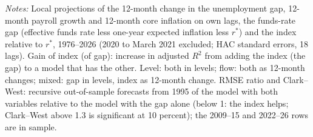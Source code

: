 \begin{table}[tbp]\centering\small
\caption{Does the Index Add to the Funds-Rate Gap?}\label{tab:stance}
\begin{flushleft}\footnotesize\textit{Notes:} Local projections of the 12-month change in the unemployment gap, 12-month payroll growth and 12-month core inflation on own lags, the funds-rate gap (effective funds rate less one-year expected inflation less $r^*$) and the index relative to $r^*$, 1976--2026 (2020 to March 2021 excluded; HAC standard errors, 18 lags). Gain of index (of gap): increase in adjusted $R^2$ from adding the index (the gap) to a model that has the other. Level: both in levels; flow: both as 12-month changes; mixed: gap in levels, index as 12-month change. RMSE ratio and Clark--West: recursive out-of-sample forecasts from 1995 of the model with both variables relative to the model with the gap alone (below 1: the index helps; Clark--West above 1.3 is significant at 10 percent); the 2009--15 and 2022--26 rows are in sample.\end{flushleft}
\end{table}
